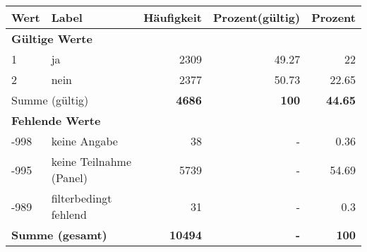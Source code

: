      \begin{longtable}{lXrrr}
     \toprule
     \textbf{Wert} & \textbf{Label} & \textbf{Häufigkeit} & \textbf{Prozent(gültig)} & \textbf{Prozent} \\
     \endhead
     \midrule
     \multicolumn{5}{l}{\textbf{Gültige Werte}}\\

     1 &
     \multicolumn{1}{X}{ ja   } &


       \num{2309} &
       \num[round-mode=places,round-precision=2]{49,27} &
         \num[round-mode=places,round-precision=2]{22} \\

     2 &
     \multicolumn{1}{X}{ nein   } &


       \num{2377} &
       \num[round-mode=places,round-precision=2]{50,73} &
         \num[round-mode=places,round-precision=2]{22,65} \\
     \midrule
     \multicolumn{2}{l}{Summe (gültig)} &
       \textbf{\num{4686}} &
     \textbf{100} &
       \textbf{\num[round-mode=places,round-precision=2]{44,65}} \\
     \multicolumn{5}{l}{\textbf{Fehlende Werte}}\\
       -998 &
       keine Angabe &
         \num{38} &
        - &
         \num[round-mode=places,round-precision=2]{0,36} \\
       -995 &
       keine Teilnahme (Panel) &
         \num{5739} &
        - &
         \num[round-mode=places,round-precision=2]{54,69} \\
       -989 &
       filterbedingt fehlend &
         \num{31} &
        - &
         \num[round-mode=places,round-precision=2]{0,3} \\
     \midrule
     \multicolumn{2}{l}{\textbf{Summe (gesamt)}} &
          \textbf{\num{10494}} &
        \textbf{-} &
        \textbf{100} \\
     \bottomrule
     \end{longtable}
     
